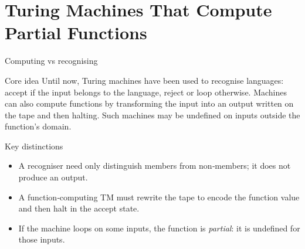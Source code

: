 %

\section{Turing Machines That Compute Partial Functions}

\begin{frame}[t]{Computing vs recognising}
  \begin{tblock}{Core idea}
    Until now, Turing machines have been used to recognise languages:
    accept if the input belongs to the language, reject or loop
    otherwise.  Machines can also compute functions by transforming the
    input into an output written on the tape and then halting.  Such
    machines may be undefined on inputs outside the function’s domain.
  \end{tblock}
  \begin{tblock}{Key distinctions}
    \begin{itemize}
      \item A recogniser need only distinguish members from non‑members;
        it does not produce an output.
      \item A function‑computing TM must rewrite the tape to encode the
        function value and then halt in the accept state.
      \item If the machine loops on some inputs, the function is
        \emph{partial}: it is undefined for those inputs.
    \end{itemize}
  \end{tblock}
  \label{fr:7.3-01}
\end{frame}

